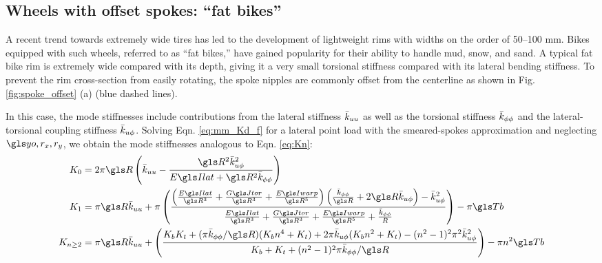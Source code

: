\documentclass[\rootdir/thesis.tex]{subfiles}
\begin{document}
\subsection{Wheels with offset spokes: ``fat bikes''}
\label{sec:fat_bikes}

A recent trend towards extremely wide tires has led to the development of lightweight rims with widths on the order of \numrange{50}{100} \si{mm}. Bikes equipped with such wheels, referred to as ``fat bikes,'' have gained popularity for their ability to handle mud, snow, and sand. A typical fat bike rim is extremely wide compared with its depth, giving it a very small torsional stiffness compared with its lateral bending stiffness. To prevent the rim cross-section from easily rotating, the spoke nipples are commonly offset from the centerline as shown in Fig. \ref{fig:spoke_offset} (a) (blue dashed lines).

In this case, the mode stiffnesses include contributions from the lateral stiffness $\bar{k}_{uu}$ as well as the torsional stiffness $\bar{k}_{\phi\phi}$ and the lateral-torsional coupling stiffness $\bar{k}_{u\phi}$. Solving Eqn. \eqref{eq:mm_Kd_f} for a lateral point load with the smeared-spokes approximation and neglecting $\yo, r_x, r_y$, we obtain the mode stiffnesses analogous to Eqn. \eqref{eq:Kn}:
\begin{subequations}\label{eq:Kn_offset}
\begin{align}
K_0 &= 2\pi\R \left(\kuu - \frac{\R^2\kup^2}{\EIl + \R^2\kpp}\right)\\
K_1 &=  \pi\R\kuu + \pi\left(\frac{\left(\frac{\EIl}{\R^3} + \frac{\GJ}{\R^3} + \frac{\EIw}{\R^5}\right)
                                   \left(\frac{\kpp}{\R}+2\R\kup\right) - \kup^2}
                                  {\frac{\EIl}{\R^3} + \frac{\GJ}{\R^3} + \frac{\EIw}{\R^5} + \frac{\kpp}{R}}\right)
        -\pi \Tb\\
K_{n\geq2} & = \pi\R\kuu + \left(\frac{\Kbend \Ktors +
                                       (\pi\kpp/\R)(\Kbend n^4+\Ktors)
                                       +2\pi\kup(\Kbend n^2 + \Ktors)
                                       -(n^2-1)^2\pi^2\kup^2}
                                      {\Kbend + \Ktors + (n^2-1)^2\pi\kpp/\R}\right)
                -\pi n^2 \Tb
\end{align}
\end{subequations}
\end{document}
